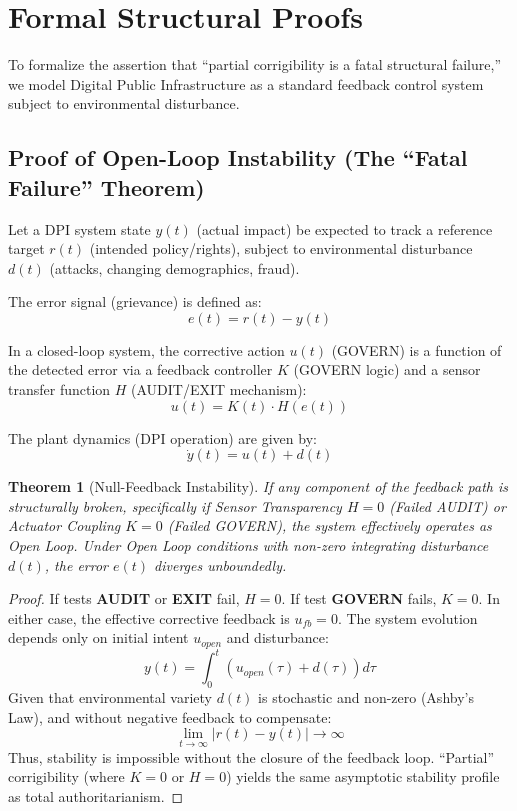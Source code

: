 \documentclass{article}
\newtheorem{theorem}{Theorem}
\begin{document}
\section{Formal Structural Proofs}
\label{appendix:proofs}

To formalize the assertion that ``partial corrigibility is a fatal structural failure,'' we model Digital Public Infrastructure as a standard feedback control system subject to environmental disturbance.

\subsection{Proof of Open-Loop Instability (The ``Fatal Failure'' Theorem)}

Let a DPI system state $y(t)$ (actual impact) be expected to track a reference target $r(t)$ (intended policy/rights), subject to environmental disturbance $d(t)$ (attacks, changing demographics, fraud).

The error signal (grievance) is defined as:
\begin{equation}
e(t) = r(t) - y(t)
\end{equation}

In a closed-loop system, the corrective action $u(t)$ (GOVERN) is a function of the detected error via a feedback controller $K$ (GOVERN logic) and a sensor transfer function $H$ (AUDIT/EXIT mechanism):
\begin{equation}
u(t) = K(t) \cdot H(e(t))
\end{equation}

The plant dynamics (DPI operation) are given by:
\begin{equation}
\dot{y}(t) = u(t) + d(t)
\end{equation}

\begin{theorem}[Null-Feedback Instability]
If any component of the feedback path is structurally broken, specifically if Sensor Transparency $H=0$ (Failed AUDIT) or Actuator Coupling $K=0$ (Failed GOVERN), the system effectively operates as Open Loop. Under Open Loop conditions with non-zero integrating disturbance $d(t)$, the error $e(t)$ diverges unboundedly.
\end{theorem}

\begin{proof}
If tests \textbf{AUDIT} or \textbf{EXIT} fail, $H=0$.
If test \textbf{GOVERN} fails, $K=0$.
In either case, the effective corrective feedback is $u_{fb} = 0$.
The system evolution depends only on initial intent $u_{open}$ and disturbance:
\begin{equation}
y(t) = \int_0^t (u_{open}(\tau) + d(\tau)) d\tau
\end{equation}
Given that environmental variety $d(t)$ is stochastic and non-zero (Ashby's Law), and without negative feedback to compensate:
\begin{equation}
\lim_{t \to \infty} |r(t) - y(t)| \to \infty
\end{equation}
Thus, stability is impossible without the closure of the feedback loop. ``Partial'' corrigibility (where $K=0$ or $H=0$) yields the same asymptotic stability profile as total authoritarianism.
\end{proof}
\end{document}
